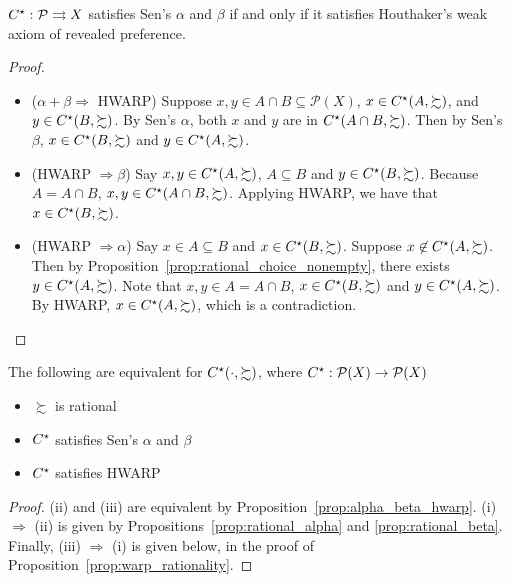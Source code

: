 \documentclass[12pt]{article}
\begin{document}
\begin{proposition}\label{prop:alpha_beta_hwarp}
	$C^\star : \mathcal{P} \rightrightarrows X$ satisfies Sen's $\alpha$ and $\beta$ if and only if it satisfies Houthaker's weak axiom of revealed preference.
\end{proposition}
\begin{proof}
	
	\begin{itemize}
		\item[(i)] ($\alpha + \beta \Longrightarrow $ HWARP) Suppose $x,y \in A \cap B \subseteq \mathcal{P}(X)$, $x \in C^\star(A,\succsim)$, and $y \in C^\star(B,\succsim)$. By Sen's $\alpha$, both $x$ and $y$ are in $C^\star(A \cap B,\succsim)$. Then by Sen's $\beta$, $x \in C^\star(B,\succsim)$ and $y \in C^\star(A,\succsim)$.
		
		\item[(ii)] (HWARP $\Longrightarrow \beta$) Say $x,y \in C^\star(A,\succsim)$, $A \subseteq B$ and $y \in C^\star(B,\succsim)$. Because $A = A \cap B$, $x,y \in C^\star(A \cap B,\succsim)$. Applying HWARP, we have that $x \in C^\star(B,\succsim)$.
		
		\item[(iii)] (HWARP $\Longrightarrow \alpha$) Say $x \in A \subseteq B$ and $x \in C^\star(B,\succsim)$. Suppose $x \not\in C^\star(A,\succsim)$. Then by Proposition~\ref{prop:rational_choice_nonempty}, there exists $y \in C^\star(A,\succsim)$. Note that $x,y \in A = A \cap B$, $x \in C^\star(B,\succsim)$ and $y \in C^\star(A,\succsim)$. By HWARP, $x \in C^\star(A,\succsim)$, which is a contradiction.
	\end{itemize}
\end{proof}

\begin{proposition}\label{prop:hwarp_alpha_beta_equiv}
	The following are equivalent for $C^\star(\cdot,\succsim)$, where $C^\star: \mathcal{P}(X) \to \mathcal{P}(X)$
	\begin{itemize}
		\item[(i)] $\succsim$ is rational
		\item[(ii)] $C^\star$ satisfies Sen's $\alpha$ and $\beta$
		\item[(iii)] $C^\star$ satisfies HWARP
	\end{itemize}
\end{proposition}
\begin{proof}
	(ii) and (iii) are equivalent by Proposition~\ref{prop:alpha_beta_hwarp}. (i) $\Longrightarrow$ (ii) is given by Propositions~\ref{prop:rational_alpha} and \ref{prop:rational_beta}. Finally, (iii) $\Longrightarrow$ (i) is given below, in the proof of Proposition~\ref{prop:warp_rationality}.
\end{proof}
\end{document}
